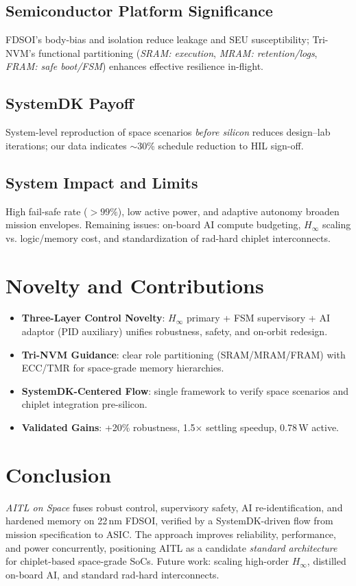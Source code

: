 \documentclass[conference]{IEEEtran}
\begin{document}
\subsection{Semiconductor Platform Significance}
FDSOI’s body-bias and isolation reduce leakage and SEU susceptibility; Tri-NVM’s
functional partitioning (\emph{SRAM: execution}, \emph{MRAM: retention/logs},
\emph{FRAM: safe boot/FSM}) enhances effective resilience in-flight.

\subsection{SystemDK Payoff}
System-level reproduction of space scenarios \emph{before silicon} reduces design--lab
iterations; our data indicates $\sim$30\% schedule reduction to HIL sign-off.

\subsection{System Impact and Limits}
High fail-safe rate ($>\!99\%$), low active power, and adaptive autonomy broaden
mission envelopes. Remaining issues: on-board AI compute budgeting, $H_\infty$
scaling vs. logic/memory cost, and standardization of rad-hard chiplet interconnects.

\section*{Novelty and Contributions}
\begin{itemize}
  \item \textbf{Three-Layer Control Novelty}: $H_\infty$ primary + FSM supervisory + AI adaptor
  (PID auxiliary) unifies robustness, safety, and on-orbit redesign.
  \item \textbf{Tri-NVM Guidance}: clear role partitioning (SRAM/MRAM/FRAM) with ECC/TMR
  for space-grade memory hierarchies.
  \item \textbf{SystemDK-Centered Flow}: single framework to verify space scenarios and
  chiplet integration pre-silicon.
  \item \textbf{Validated Gains}: +20\% robustness, 1.5$\times$ settling speedup, 0.78\,W active.
\end{itemize}

\section*{Conclusion}
\emph{AITL on Space} fuses robust control, supervisory safety, AI re-identification,
and hardened memory on 22\,nm FDSOI, verified by a SystemDK-driven flow
from mission specification to ASIC. The approach improves reliability, performance,
and power concurrently, positioning AITL as a candidate \emph{standard architecture}
for chiplet-based space-grade SoCs. Future work: scaling high-order $H_\infty$,
distilled on-board AI, and standard rad-hard interconnects.
\end{document}
